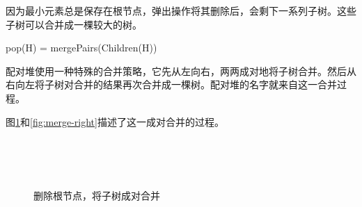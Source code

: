 \documentclass[b5paper]{ctexart}
\begin{document}
因为最小元素总是保存在根节点，弹出操作将其删除后，会剩下一系列子树。这些子树可以合并成一棵较大的树。

\be
  pop(H) = mergePairs(Children(H))
\ee

配对堆使用一种特殊的合并策略，它先从左向右，两两成对地将子树合并。然后从右向左将子树对合并的结果再次合并成一棵树。配对堆的名字就来自这一合并过程。

图\ref{fig:merge-pairs}和\ref{fig:merge-right}描述了这一成对合并的过程。

\begin{figure}[htbp]
  \centering
   \\
   \\
   \\
  \caption{删除根节点，将子树成对合并} \label{fig:merge-pairs}
\end{figure}
\end{document}
